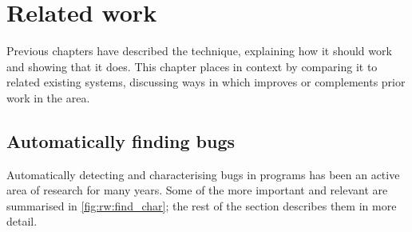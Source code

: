 \chapter{Related work}
\label{chapter:related_work}

Previous chapters have described the {\technique} technique,
explaining how it should work and showing that it does.  This chapter
places {\technique} in context by comparing it to related existing
systems, discussing ways in which {\technique} improves or complements
prior work in the area.

\section{Automatically finding bugs}

Automatically detecting and characterising bugs in programs has been
an active area of research for many years.  Some of the more important
and relevant are summarised in \autoref{fig:rw:find_char}; the rest of
the section describes them in more detail.

